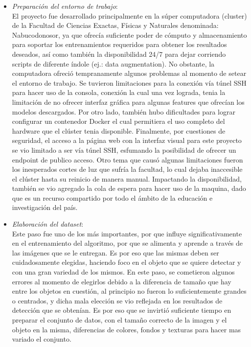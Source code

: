 \begin{itemize}
        \item \textit{Preparación del entorno de trabajo}: \\
            El proyecto fue desarrollado principalmente en la súper computadora (cluster) de la Facultad de Ciencias Exactas, Físicas y Naturales denominada: Nabucodonosor, ya que ofrecía suficiente poder de cómputo y almacenamiento para soportar los entrenamientos requeridos para obtener los resultados deseados, así como también la disponibilidad 24/7 para dejar corriendo scripts de diferente índole (ej.: data augmentation). No obstante, la computadora ofreció tempranamente algunos problemas al momento de setear el entorno de trabajo. Se tuvieron limitaciones para la conexión vía túnel SSH para hacer uso de la consola, conexión la cual una vez lograda, tenia la limitación de no ofrecer interfaz gráfica para algunas features que ofrecían los modelos descargados.
            Por otro lado, también hubo dificultades para lograr configurar un contenedor Docker el cual permitiera el uso completo del hardware que el clúster tenia disponible. Finalmente, por cuestiones de seguridad, el acceso a la página web con la interfaz visual para este proyecto se vio limitado a ser vía túnel SSH, esfumando la posibilidad de ofrecer un endpoint de publico acceso.
            Otro tema que causó algunas limitaciones fueron los inesperados cortes de luz que sufría la facultad, lo cual dejaba inaccesible el clúster hasta su reinicio de manera manual. Impactando la disponibilidad, también se vio agregado la cola de espera para hacer uso de la maquina, dado que es un recurso compartido por todo el ámbito de la educación e investigación del país. \\
        
        \item \textit{Elaboración del dataset}: \\
            Este paso fue uno de los más importantes, por que influye significativamente en el entrenamiento del algoritmo, por que se alimenta y aprende a través de las imágenes que se le entregan. Es por eso que las mismas deben ser cuidadosamente elegidas, haciendo foco en el objeto que se quiere detectar y con una gran variedad de los mismos. En este paso, se cometieron algunos errores al momento de elegirlos debido a la diferencia de tamaño que hay entre los objetos en cuestión, al principio no fueron lo suficientemente grandes o centrados, y dicha mala elección se vio reflejada en los resultados de detección que se obtenían. Es por eso que se invirtió suficiente tiempo en preparar el conjunto de datos, con el tamaño correcto de la imagen y el objeto en la misma, diferencias de colores, fondos y texturas para hacer mas variado el conjunto. \\
            

\end{itemize}
